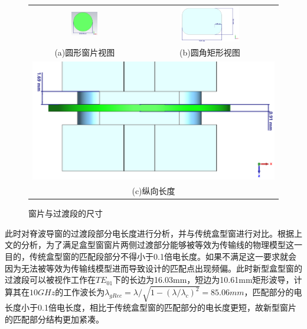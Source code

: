 \documentclass[master]{thesis-uestc}
\begin{document}
\begin{figure}[!htbp]
    \small
    \centering
    \begin{tabular}{@{\ }c@{\ }c}
        \includegraphics[width=0.25\textwidth]{pic/chapter3/圆形窗片视图.png} & 
        \hspace{5pt}
        \includegraphics[width=0.45\textwidth]{pic/chapter3/圆角矩形视图.png}     \\
        \mbox{\small (a)圆形窗片视图}                                                                               & 
        \mbox{\small (b)圆角矩形视图}                                                                                  \\[6bp]
        \multicolumn{2}{c}{\includegraphics[scale=0.21]{pic/chapter3/纵向长度视图.png}} \\  %
        \multicolumn{2}{c}{\mbox{\small (c)纵向长度}}
    \end{tabular}
    \caption{窗片与过渡段的尺寸}
    \label{fig:窗片与过渡段的尺寸}
\end{figure}

此时对脊波导窗的过渡段部分电长度进行分析，并与传统盒型窗进行对比。根据上文的分析，为了满足盒型窗窗片两侧过渡部分能够被等效为传输线的物理模型这一目的，传统盒型窗的匹配段部分不得小于0.1倍电长度。如果不满足这一要求就会因为无法被等效为传输线模型进而导致设计的匹配点出现频偏。此时新型盒型窗的过渡段可以被视作工作在$TE_{01}$下的长边为16.03mm，短边为10.61mm矩形波导，计算其在$10GHz$的工作波长为$\lambda_{gRec}=\lambda / \sqrt{1-(\lambda / \lambda_c)^2}=85.06mm$，匹配部分的电长度小于0.1倍电长度，相比于传统盒型窗的匹配部分的电长度更短，故新型窗片的匹配部分结构更加紧凑。
\end{document}
